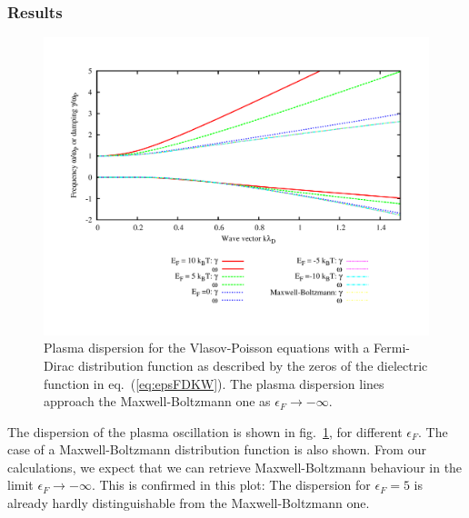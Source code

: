 \documentclass[physics,phd,nolot,nolof]{uccthesis}%
\begin{document}
\subsubsection{Results}
\begin{figure}[h]
	\begin{center}
	\includegraphics[width=\textwidth]{VPFDdebye.pdf}
	\end{center}
	\caption{Plasma dispersion for the Vlasov-Poisson equations with a Fermi-Dirac distribution function as described by the zeros of the dielectric function in eq.~(\ref{eq:epsFDKW}). The plasma dispersion lines approach the Maxwell-Boltzmann one as $\epsilon_F\to-\infty$.}
	\label{fig:plasmadispersionVPFD}
\end{figure}
The dispersion of the plasma oscillation is shown in fig.~\ref{fig:plasmadispersionVPFD}, for different $\epsilon_F$.
The case of a Maxwell-Boltzmann distribution function is also shown. 
From our calculations, we expect that we can retrieve Maxwell-Boltzmann behaviour in the limit
$\epsilon_F\to-\infty$. 
This is confirmed in this plot: The dispersion for $\epsilon_F=5$ is already hardly distinguishable from the Maxwell-Boltzmann one.
\end{document}
